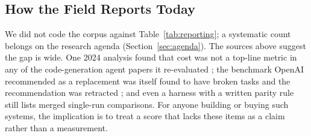 \subsection{How the Field Reports Today}

We did not code the corpus against Table~\ref{tab:reporting}; a systematic count belongs on the research agenda (Section~\ref{sec:agenda}). The sources above suggest the gap is wide. One 2024 analysis found that cost was not a top-line metric in any of the code-generation agent papers it re-evaluated \citep{A10}; the benchmark OpenAI recommended as a replacement was itself found to have broken tasks and the recommendation was retracted \citep{C15,V31}; and even a harness with a written parity rule still lists merged single-run comparisons. For anyone building or buying such systems, the implication is to treat a score that lacks these items as a claim rather than a measurement.
